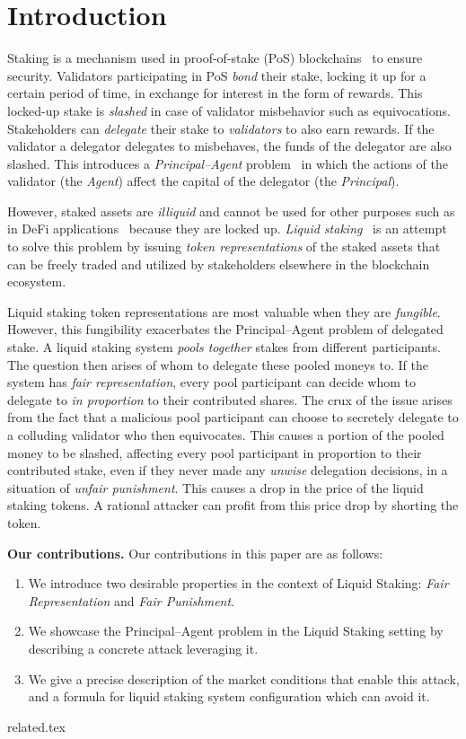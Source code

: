 \section{Introduction}

Staking is a mechanism used in proof-of-stake (PoS)
blockchains~\cite{2018tendermint,buchman2016tendermint,ouroboros,algorand,casper}
to ensure security. Validators participating in PoS
\emph{bond} their stake, locking it up for a certain period of time,
in exchange for interest in the form of rewards.
This locked-up stake is \emph{slashed} in case of validator misbehavior
such as equivocations.
Stakeholders can \emph{delegate} their stake to \emph{validators} to also
earn rewards. If the validator a delegator delegates to misbehaves,
the funds of the delegator are also slashed. This introduces a
\emph{Principal--Agent} problem~\cite{jensen1976,wealthofnations}
in which the actions of the validator (the \emph{Agent})
affect the capital of the delegator (the \emph{Principal}).

However, staked assets are \emph{illiquid} and cannot be used for
other purposes such as in DeFi applications~\cite{defi-sok}
because they are locked up.
\emph{Liquid staking}~\cite{liquid-staking-report}
is an attempt to solve this problem by issuing
\emph{token representations} of the staked assets that can be freely traded
and utilized by stakeholders elsewhere in the blockchain ecosystem.

Liquid staking token representations are most valuable when they are
\emph{fungible}. However, this fungibility exacerbates the Principal--Agent
problem of delegated stake.
A liquid staking system \emph{pools together} stakes from different participants.
The question then arises of whom to delegate these pooled moneys to.
If the system has \emph{fair representation}, every pool participant
can decide whom to delegate to \emph{in proportion} to their contributed shares.
The crux of the issue arises from the fact
that a malicious pool participant can choose to secretely delegate to
a colluding validator who then equivocates. This causes a portion
of the pooled money to be slashed, affecting every pool participant
in proportion to their contributed stake, even if they never made
any \emph{unwise} delegation decisions, in a situation of
\emph{unfair punishment}. This causes a drop in the price of the
liquid staking tokens. A rational attacker can profit from this price
drop by shorting the token.

\noindent
\textbf{Our contributions.} Our contributions in this paper are as follows:
\begin{enumerate}
    \item We introduce two desirable properties in the context of Liquid Staking: \emph{Fair Representation} and \emph{Fair Punishment}.
    \item We showcase the Principal--Agent problem in the Liquid Staking setting by describing a concrete attack leveraging it.
    \item We give a precise description of the market conditions that enable this attack, and a formula for liquid staking system configuration which can avoid it.
\end{enumerate}

{related.tex}
